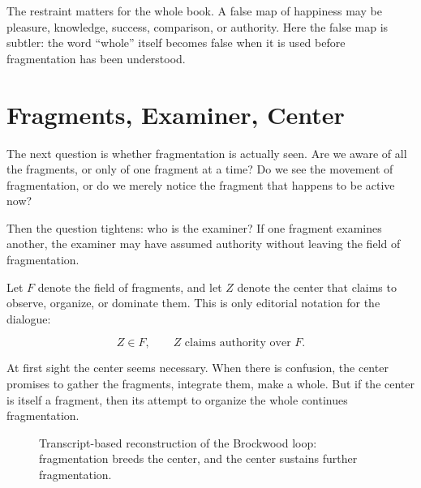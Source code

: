 \documentclass[11pt,oneside]{book}
\begin{document}
The restraint matters for the whole book. A false map of happiness may be pleasure, knowledge, success, comparison, or authority. Here the false map is subtler: the word ``whole'' itself becomes false when it is used before fragmentation has been understood.

\section{Fragments, Examiner, Center}

The next question is whether fragmentation is actually seen. Are we aware of all the fragments, or only of one fragment at a time? Do we see the movement of fragmentation, or do we merely notice the fragment that happens to be active now?

Then the question tightens: who is the examiner? If one fragment examines another, the examiner may have assumed authority without leaving the field of fragmentation.

Let \(F\) denote the field of fragments, and let \(Z\) denote the center that claims to observe, organize, or dominate them. This is only editorial notation for the dialogue:

\begin{equation}
Z\in F,
\qquad
Z \text{ claims authority over } F.
\end{equation}

At first sight the center seems necessary. When there is confusion, the center promises to gather the fragments, integrate them, make a whole. But if the center is itself a fragment, then its attempt to organize the whole continues fragmentation.

\begin{figure}
\centering
{}

Transcript-based reconstruction of the Brockwood loop: fragmentation breeds the center, and the center sustains further fragmentation.
\end{figure}
\end{document}
